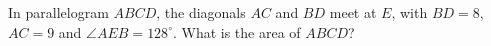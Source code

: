 In parallelogram $ABCD$, the diagonals $AC$ and $BD$ meet at $E$, with $BD=8$, $AC=9$ and $\angle AEB=128^\circ$. What is the area of $ABCD$?
